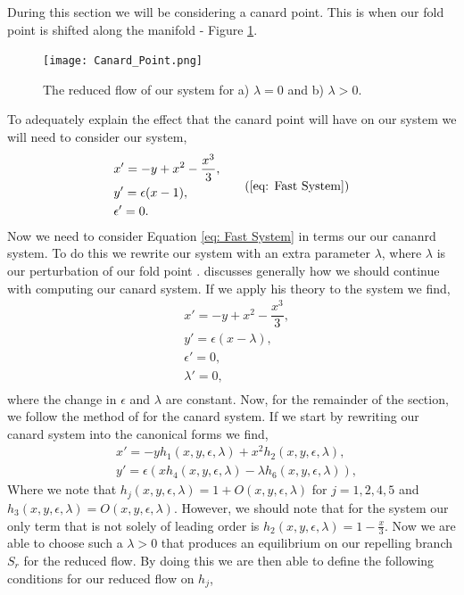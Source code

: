
During this section we will be considering a canard point. This is when our fold point is shifted along the manifold - Figure \ref{fig: Canard Point}. 
\begin{figure}[h!]
	\centering
	\texttt{[image: Canard\_Point.png]}
	\caption{The reduced flow of our system for a) $\lambda=0$ and b) $\lambda>0$.}
	\label{fig: Canard Point}
\end{figure}
To adequately explain the effect that the canard point will have on our system we will need to consider our system,
\begin{equation}
\begin{aligned}
&x'=-y+x^2-\dfrac{x^3}{3},\\
&y'=\epsilon(x-1),\\
&\epsilon'=0.\\
\end{aligned}
\tag{\ref{eq: Fast System}}
\end{equation}
Now we need to consider Equation \ref{eq: Fast System} in terms our our cananrd system. To do this we rewrite our system with an extra parameter $\lambda$, where $\lambda$ is our perturbation of our fold point \citep{krupa2001}. \citet{krupa2001} discusses generally how we should continue with computing our canard system. If we apply his theory to the \vdp system we find,
\begin{equation}
\begin{aligned}
&x'=-y+x^2-\dfrac{x^3}{3},\\
&y'=\epsilon(x-\lambda),\\
&\epsilon'=0,\\
&\lambda'=0,\\
\end{aligned}
\label{eq: canard system}
\end{equation}
where the change in $\epsilon$ and $\lambda$ are constant. Now, for the remainder of the section, we follow the method of \citet{krupa2001} for the canard system. If we start by rewriting our canard system into the canonical forms we find,
\begin{subequations}
	\begin{align}
		&x'=-yh_1(x,y,\epsilon,\lambda)+x^2h_2(x,y,\epsilon,\lambda),\\
		&y'=\epsilon(xh_4(x,y,\epsilon,\lambda)-\lambda h_6(x,y,\epsilon,\lambda)),
	\end{align}
\end{subequations}
Where we note that $h_j(x,y,\epsilon,\lambda)=1+O(x,y,\epsilon,\lambda)$ for $j=1,2,4,5$ and $h_3(x,y,\epsilon,\lambda)=O(x,y,\epsilon,\lambda)$. However, we should note that for the \vdp system our only term that is not solely of leading order is $h_2(x,y,\epsilon,\lambda)=1-\frac{x}{3}$. Now we are able to choose such a $\lambda>0$ that produces an equilibrium on our repelling branch $S_r$ for the reduced flow. By doing this we are then able to define the following conditions for our reduced flow on $h_j$,
